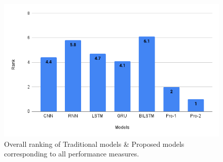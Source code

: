 \documentclass[a4paper, fleqn]{cas-sc}
\begin{document}
\begin{figure}[ht!]
  \centering
   \includegraphics[scale=.7]{rankplot.png}
   \caption{Overall ranking of Traditional models \& Proposed models corresponding to all performance measures.}
 \end{figure}
\end{document}
